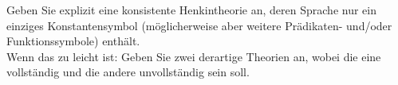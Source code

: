 
\begin{exercise}[138]

Geben Sie explizit eine konsistente Henkintheorie an, deren Sprache nur ein
einziges Konstantensymbol (möglicherweise aber weitere Prädikaten- und/oder
Funktionssymbole) enthält. \\
Wenn das zu leicht ist: Geben Sie zwei derartige Theorien an, wobei die eine
vollständig und die andere unvollständig sein soll.

\end{exercise}


\begin{solution}

\phantom{}

\end{solution}

